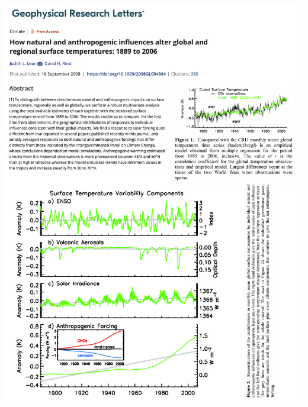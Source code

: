 \documentclass[12pt]{article}
\begin{document}
\begin{center}
\includegraphics[width=\textwidth]{images/lean2008.pdf}
\end{center}


\vspace{2cm} 
\newpage
\end{document}
